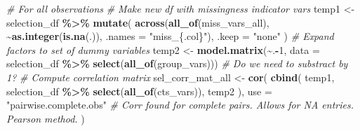 \documentclass[
]{article}
\newenvironment{Shaded}{\begin{snugshade}}{\end{snugshade}}
\newcommand{\AttributeTok}[1]{\textcolor[rgb]{0.13,0.29,0.53}{#1}}
\newcommand{\CommentTok}[1]{\textcolor[rgb]{0.56,0.35,0.01}{\textit{#1}}}
\newcommand{\DecValTok}[1]{\textcolor[rgb]{0.00,0.00,0.81}{#1}}
\newcommand{\FunctionTok}[1]{\textcolor[rgb]{0.13,0.29,0.53}{\textbf{#1}}}
\newcommand{\NormalTok}[1]{#1}
\newcommand{\OtherTok}[1]{\textcolor[rgb]{0.56,0.35,0.01}{#1}}
\newcommand{\SpecialCharTok}[1]{\textcolor[rgb]{0.81,0.36,0.00}{\textbf{#1}}}
\newcommand{\StringTok}[1]{\textcolor[rgb]{0.31,0.60,0.02}{#1}}
\newcounter{none} %
\begin{document}
\begin{Shaded}
\begin{Highlighting}[]
\CommentTok{\# For all observations}
\CommentTok{\# Make new df with missingness indicator vars}
\NormalTok{temp1 }\OtherTok{\textless{}{-}}\NormalTok{ selection\_df }\SpecialCharTok{\%\textgreater{}\%} 
  \FunctionTok{mutate}\NormalTok{(}
    \FunctionTok{across}\NormalTok{(}\FunctionTok{all\_of}\NormalTok{(miss\_vars\_all), }
           \SpecialCharTok{\textasciitilde{}}\FunctionTok{as.integer}\NormalTok{(}\FunctionTok{is.na}\NormalTok{(.)),}
           \AttributeTok{.names =} \StringTok{"miss\_\{.col\}"}\NormalTok{),}
    \AttributeTok{.keep =} \StringTok{"none"}
\NormalTok{  )}
\CommentTok{\# Expand factors to set of dummy variables}
\NormalTok{temp2 }\OtherTok{\textless{}{-}} \FunctionTok{model.matrix}\NormalTok{(}\SpecialCharTok{\textasciitilde{}}\NormalTok{.}\SpecialCharTok{{-}}\DecValTok{1}\NormalTok{, }\AttributeTok{data =}\NormalTok{ selection\_df }\SpecialCharTok{\%\textgreater{}\%} \FunctionTok{select}\NormalTok{(}\FunctionTok{all\_of}\NormalTok{(group\_vars))) }\CommentTok{\# Do we need to substract by 1?}
\CommentTok{\# Compute correlation matrix}
\NormalTok{sel\_corr\_mat\_all }\OtherTok{\textless{}{-}} \FunctionTok{cor}\NormalTok{(}
  \FunctionTok{cbind}\NormalTok{(}
\NormalTok{    temp1, }
\NormalTok{    selection\_df }\SpecialCharTok{\%\textgreater{}\%} \FunctionTok{select}\NormalTok{(}\FunctionTok{all\_of}\NormalTok{(cts\_vars)), }
\NormalTok{    temp2}
\NormalTok{    ),}
  \AttributeTok{use =} \StringTok{"pairwise.complete.obs"} \CommentTok{\# Corr found for complete pairs. Allows for NA entries. Pearson method.}
\NormalTok{)}


\end{Highlighting}
\end{Shaded}
\end{document}
